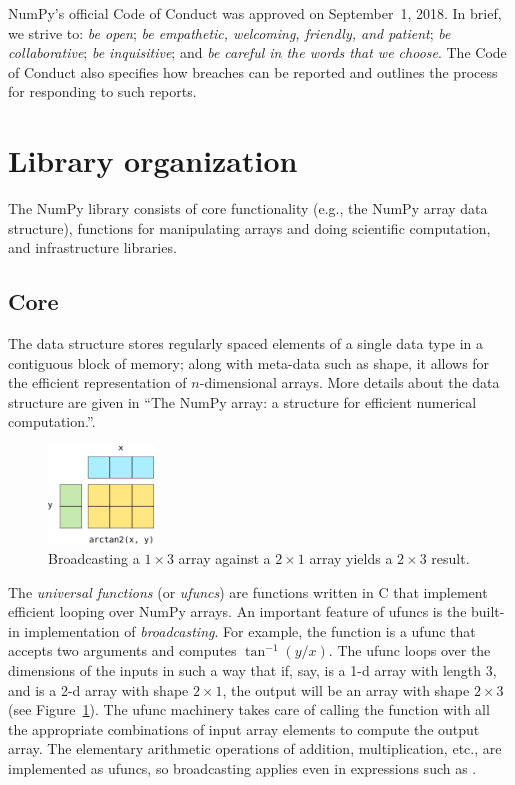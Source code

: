 NumPy's official Code of Conduct was approved on September~1, 2018\cite{NumPyCodeofConduct}.
In brief, we strive to:
\emph{be open};
\emph{be empathetic, welcoming, friendly, and patient};
\emph{be collaborative};
\emph{be inquisitive}; and
\emph{be careful in the words that we choose}.
The Code of Conduct also specifies how breaches can be reported and outlines
the process for responding to such reports.

\section*{Library organization}

The NumPy library consists of core functionality (e.g., the NumPy array data structure),
functions for manipulating arrays and doing scientific computation, and infrastructure
libraries.

\subsection*{Core}

The  data structure stores regularly spaced elements of a single
data type in a contiguous block of memory; along with meta-data such as shape,
it allows for the efficient representation of $n$-dimensional arrays.
More details about the data structure are given in ``The NumPy array:
a structure for efficient numerical computation.''\cite{vanderwalt2011numpy}.

\begin{figure}
  \centering
  \includegraphics[width=0.25\textwidth]{static/broadcasting}
  \caption{
    Broadcasting a $1 \times 3$ array against a $2 \times 1$ array
    yields a $2 \times 3$ result.
  }
  \label{fig:broadcasting}
\end{figure}

The \emph{universal functions} (or \emph{ufuncs})
are functions written in C that implement efficient looping over
NumPy arrays. An important feature of ufuncs is the built-in
implementation of \emph{broadcasting}.  For example, the function
 is a ufunc that accepts two arguments and computes
$\tan^{-1}(y/x)$.  The ufunc loops over the dimensions of the inputs
in such a way that if, say,  is a 1-d array with length 3, and
 is a 2-d array with shape $2 \times 1$, the output will be
an array with shape $2 \times 3$ (see Figure~\ref{fig:broadcasting}).  The ufunc machinery takes care
of calling the function with all the appropriate combinations of
input array elements to compute the output array.
The elementary arithmetic operations of addition, multiplication, etc.,
are implemented as ufuncs, so broadcasting applies even in expressions
such as .

